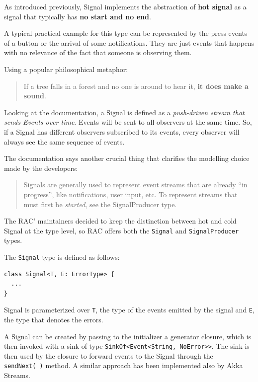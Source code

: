 As introduced previously, Signal implements the abstraction of
\textbf{hot signal} as a signal that typically has \textbf{no start and
no end}.

A typical practical example for this type can be represented by the press
events of a button or the arrival of some notifications. They are just
events that happens with no relevance of the fact that someone is
observing them.

Using a popular philosophical metaphor:

\begin{quote}
If a tree falls in a forest and no one is around to hear it, \textbf{it
does make a sound}.
\end{quote}

Looking at the documentation, a Signal is defined as a \emph{push-driven
stream that sends Events over time}. Events will be sent to all
observers at the same time. So, if a Signal has different observers
subscribed to its events, every observer will always see the same
sequence of events.

The documentation says another crucial thing that clarifies the
modelling choice made by the developers:

\begin{quote}
Signals are generally used to represent event streams that are already
``in progress'', like notifications, user input, etc. To represent
streams that must first be \emph{started}, see the SignalProducer type.
\end{quote}

The RAC' maintainers decided to keep the distinction between hot and cold
Signal at the type level, so RAC offers both the \texttt{Signal} and
\texttt{SignalProducer} types.

The \texttt{Signal} type is defined as follows:

\begin{verbatim}
class Signal<T, E: ErrorType> {
  ...
}
\end{verbatim}

Signal is parameterized over \texttt{T}, the type of the events emitted
by the signal and \texttt{E}, the type that denotes the errors.

A Signal can be created by passing to the initializer a generator
closure, which is then invoked with a sink of type
\texttt{SinkOf\textless{}Event\textless{}String,\ NoError\textgreater{}\textgreater{}}.
The sink is then used by the closure to forward events to the Signal
through the \texttt{sendNext(\ )} method. A similar approach has been
implemented also by Akka Streams.

